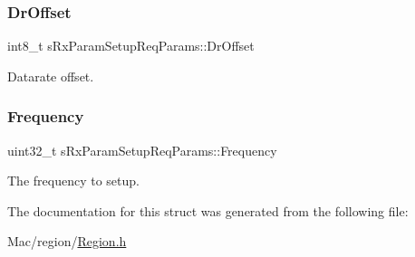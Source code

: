 \subsubsection{\texorpdfstring{Dr\+Offset}{DrOffset}}
{\footnotesize\ttfamily int8\+\_\+t s\+Rx\+Param\+Setup\+Req\+Params\+::\+Dr\+Offset}

Datarate offset. \mbox{\label{structsRxParamSetupReqParams_a2cf70cbc0939be65e8c1257e45ae5530}} 
\subsubsection{\texorpdfstring{Frequency}{Frequency}}
{\footnotesize\ttfamily uint32\+\_\+t s\+Rx\+Param\+Setup\+Req\+Params\+::\+Frequency}

The frequency to setup. 

The documentation for this struct was generated from the following file\+:\begin{DoxyCompactItemize}
\item 
Mac/region/\hyperlink{Region_8h}{Region.\+h}\end{DoxyCompactItemize}
